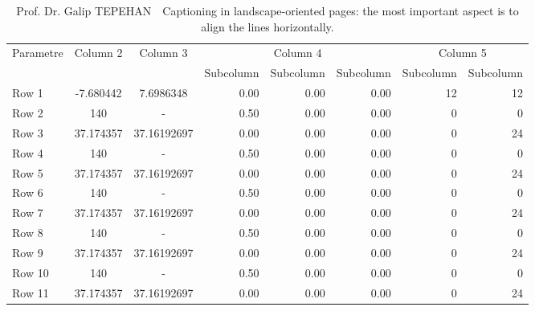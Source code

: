 \begin{landscape}
	\thispagestyle{empty}
	\begin{table*}[htb!]
		{\setlength{\tabcolsep}{14pt}
			\caption{Prof. Dr. Galip TEPEHAN \,\, Captioning in landscape-oriented pages:
				the most important aspect is to align the lines horizontally.}
			\begin{center}
				\vspace{-6mm}
				\begin{tabular}{lccrrrrr}
					\hline\hline
					\multirow{2}{*}{Parametre} & \multirow{2}{*}{Column 2} & \multirow{2}{*}{Column 3} & \multicolumn{3}{c|}{Column 4} & \multicolumn{2}{c}{Column 5}\\ \cline{4-8}
					& & & Subcolumn & Subcolumn & Subcolumn & Subcolumn & Subcolumn\\
					\hline
					Row 1 & -7.680442 & 7.6986348 & 0.00 & 0.00 & 0.00 & 12 & 12 \\
					Row 2 & 140 & - & 0.50 & 0.00 & 0.00 & 0 & 0 \\
					Row 3 & 37.174357 & 37.16192697 & 0.00 & 0.00 & 0.00 & 0 & 24 \\
					Row 4 & 140 & - & 0.50 & 0.00 & 0.00 & 0 & 0 \\
					Row 5 & 37.174357 & 37.16192697 & 0.00 & 0.00 & 0.00 & 0 & 24 \\
					Row 6 & 140 & - & 0.50 & 0.00 & 0.00 & 0 & 0 \\
					Row 7 & 37.174357 & 37.16192697 & 0.00 & 0.00 & 0.00 & 0 & 24 \\
					Row 8 & 140 & - & 0.50 & 0.00 & 0.00 & 0 & 0 \\
					Row 9 & 37.174357 & 37.16192697 & 0.00 & 0.00 & 0.00 & 0 & 24 \\
					Row 10 & 140 & - & 0.50 & 0.00 & 0.00 & 0 & 0 \\
					Row 11 & 37.174357 & 37.16192697 & 0.00 & 0.00 & 0.00 & 0 & 24 \\

\end{tabular}
\end{center}}
\end{table*}
\end{landscape}
